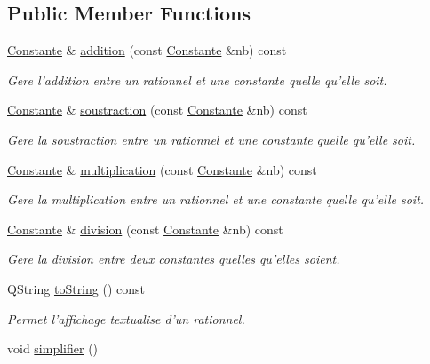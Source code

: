 \subsection*{\-Public \-Member \-Functions}
\begin{DoxyCompactItemize}
\item 
\hyperlink{class_l_o21_1_1_constante}{\-Constante} \& \hyperlink{class_l_o21_1_1_rationnel_a67e3dea6269482abdf3101e16e53c769}{addition} (const \hyperlink{class_l_o21_1_1_constante}{\-Constante} \&nb) const 
\begin{DoxyCompactList}\small\item\em \-Gere l'addition entre un rationnel et une constante quelle qu'elle soit. \end{DoxyCompactList}\item 
\hyperlink{class_l_o21_1_1_constante}{\-Constante} \& \hyperlink{class_l_o21_1_1_rationnel_a3e0d87746663be866be81543d552b6a1}{soustraction} (const \hyperlink{class_l_o21_1_1_constante}{\-Constante} \&nb) const 
\begin{DoxyCompactList}\small\item\em \-Gere la soustraction entre un rationnel et une constante quelle qu'elle soit. \end{DoxyCompactList}\item 
\hyperlink{class_l_o21_1_1_constante}{\-Constante} \& \hyperlink{class_l_o21_1_1_rationnel_ad59a24eab43b40d59e639078a9a9d638}{multiplication} (const \hyperlink{class_l_o21_1_1_constante}{\-Constante} \&nb) const 
\begin{DoxyCompactList}\small\item\em \-Gere la multiplication entre un rationnel et une constante quelle qu'elle soit. \end{DoxyCompactList}\item 
\hyperlink{class_l_o21_1_1_constante}{\-Constante} \& \hyperlink{class_l_o21_1_1_rationnel_abc26382a7434c12b941e8c68547985c4}{division} (const \hyperlink{class_l_o21_1_1_constante}{\-Constante} \&nb) const 
\begin{DoxyCompactList}\small\item\em \-Gere la division entre deux constantes quelles qu'elles soient. \end{DoxyCompactList}\item 
\-Q\-String \hyperlink{class_l_o21_1_1_rationnel_a2a7494242bcf30b5163e63133960323b}{to\-String} () const 
\begin{DoxyCompactList}\small\item\em \-Permet l'affichage textualise d'un rationnel. \end{DoxyCompactList}\item 
\hypertarget{class_l_o21_1_1_rationnel_a0ff5f18be13068386dc0c3236835593b}{void \hyperlink{class_l_o21_1_1_rationnel_a0ff5f18be13068386dc0c3236835593b}{simplifier} ()}\label{class_l_o21_1_1_rationnel_a0ff5f18be13068386dc0c3236835593b}


\end{DoxyCompactItemize}
